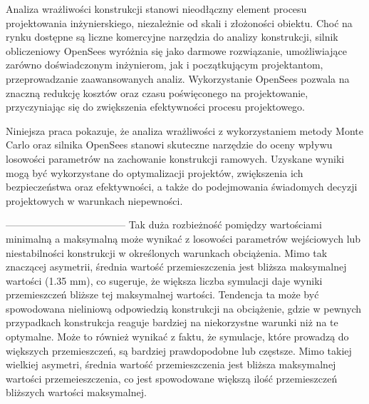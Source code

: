 Analiza wrażliwości konstrukcji stanowi nieodłączny element procesu projektowania inżynierskiego, niezależnie od skali i złożoności obiektu.
Choć na rynku dostępne są liczne komercyjne narzędzia do analizy konstrukcji, silnik obliczeniowy OpenSees wyróżnia się jako darmowe rozwiązanie, umożliwiające zarówno doświadczonym inżynierom, jak i początkującym projektantom, przeprowadzanie zaawansowanych analiz.
Wykorzystanie OpenSees pozwala na znaczną redukcję kosztów oraz czasu poświęconego na projektowanie, przyczyniając się do zwiększenia efektywności procesu projektowego.

Niniejsza praca pokazuje, że analiza wrażliwości z wykorzystaniem metody Monte Carlo oraz silnika OpenSees stanowi skuteczne narzędzie do oceny wpływu losowości parametrów na zachowanie konstrukcji ramowych.
Uzyskane wyniki mogą być wykorzystane do optymalizacji projektów, zwiększenia ich bezpieczeństwa oraz efektywności, a także do podejmowania świadomych decyzji projektowych w warunkach niepewności.


------------------------------------
Tak duża rozbieżność pomiędzy wartościami minimalną a maksymalną może wynikać z losowości parametrów wejściowych lub niestabilności konstrukcji w określonych warunkach obciążenia.
Mimo tak znaczącej asymetrii, średnia wartość przemieszczenia jest bliższa maksymalnej wartości (1.35 mm), co sugeruje, że większa liczba symulacji daje wyniki przemieszczeń bliższe tej maksymalnej wartości.
Tendencja ta może być spowodowana nieliniową odpowiedzią konstrukcji na obciążenie, gdzie w pewnych przypadkach konstrukcja reaguje bardziej na niekorzystne warunki niż na te optymalne.
Może to również wynikać z faktu, że symulacje, które prowadzą do większych przemieszczeń, są bardziej prawdopodobne lub częstsze.
Mimo takiej wielkiej asymetri, średnia wartość przemieszczenia jest bliższa maksymalnej wartości przemeieszczenia, co jest spowodowane
większą ilość przemieszczeń bliższych wartości maksymalnej.


